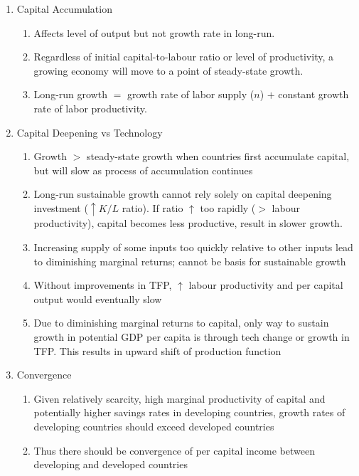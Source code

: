 \begin{remark} 
\begin{enumerate}[label=\roman*.]
\setlength{\itemsep}{0pt}
\item Capital Accumulation
\begin{enumerate}[label=\arabic*.]
\setlength{\itemsep}{0pt}
\item Affects level of output but not growth rate in long-run.
\item Regardless of initial capital-to-labour ratio or level of productivity, a growing economy will move to a point of steady-state growth.
\item Long-run growth $=$ growth rate of labor supply ($n$) $+$ constant growth rate of labor productivity.
\end{enumerate}
\item Capital Deepening vs Technology
\begin{enumerate}[label=\arabic*.]
\setlength{\itemsep}{0pt}
\item Growth $>$ steady-state growth when countries first accumulate capital, but will slow as process of accumulation continues
\item Long-run sustainable growth cannot rely solely on capital deepening investment ($\uparrow K/L$ ratio). If ratio $\uparrow$ too rapidly ($>$ labour productivity), capital becomes less productive, result in slower growth.
\item Increasing supply of some inputs too quickly relative to other inputs lead to diminishing marginal returns; cannot be basis for sustainable growth
\item Without improvements in TFP, $\uparrow$ labour productivity and per capital output would eventually slow
\item Due to diminishing marginal returns to capital, only way to sustain growth in potential GDP per capita is through tech change or growth in TFP. This results in upward shift of production function
\end{enumerate}
\item Convergence
\begin{enumerate}[label=\arabic*.]
\setlength{\itemsep}{0pt}
\item Given relatively scarcity, high marginal productivity of capital and potentially higher savings rates in developing countries, growth rates of developing countries should exceed developed countries
\item Thus there should be convergence of per capital income between developing and developed countries

\end{enumerate}
\end{enumerate}
\end{remark}
